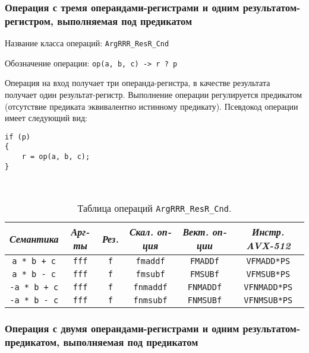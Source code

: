 \documentclass[a4paper,12pt]{extarticle}                     %
\numberwithin{equation}{section}                             %
\numberwithin{figure}{section}                               %
\numberwithin{table}{section}                                %
\theoremstyle{plain}                                         %
\numberwithin{theorem}{section}                              %
\numberwithin{lemma}{section}                                %
\numberwithin{definition}{section}                           %
\begin{document}
\newpage

\subsubsection{Операция с тремя операндами-регистрами и одним результатом-регистром, выполняемая под предикатом}

Название класса операций: \texttt{ArgRRR\_ResR\_Cnd}

Обозначение операции: \texttt{op(a, b, c) -> r ? p}

Операция на вход получает три операнда-регистра, в качестве результата получает один результат-регистр. Выполнение операции регулируется предикатом (отсутствие предиката эквивалентно истинному предикату). Псевдокод операции имеет следующий вид:

\begin{lstlisting}[caption={Псевдокод операции ArgRRR\_ResR\_Cnd.}]
if (p)
{
    r = op(a, b, c);
}

\end{lstlisting}

\

\begin{table}[!h]
\setcaptionmargin{0mm}
\onelinecaptionsfalse
{}
\caption{Таблица операций \texttt{ArgRRR\_ResR\_Cnd}.}
\bigskip
\begin{tabular}{|c|c|c|c|c|c|}
\hline
\textit{Семантика} & \textit{Арг-ты} & \textit{Рез.} & \textit{Скал. оп-ция} & \textit{Вект. оп-ции} & \textit{Инстр. AVX-512} \\
\hline
\texttt{a * b + c}  & \texttt{fff} & \texttt{f} & \texttt{fmaddf}  & \texttt{FMADDf}  & \texttt{VFMADD*PS} \\
\texttt{a * b - c}  & \texttt{fff} & \texttt{f} & \texttt{fmsubf}  & \texttt{FMSUBf}  & \texttt{VFMSUB*PS} \\
\texttt{-a * b + c} & \texttt{fff} & \texttt{f} & \texttt{fnmaddf} & \texttt{FNMADDf} & \texttt{VFNMADD*PS} \\
\texttt{-a * b - c} & \texttt{fff} & \texttt{f} & \texttt{fnmsubf} & \texttt{FNMSUBf} & \texttt{VFNMSUB*PS} \\
\hline
\end{tabular}
\end{table}

\newpage

\subsubsection{Операция с двумя операндами-регистрами и одним результатом-предикатом, выполняемая под предикатом}
\end{document}
